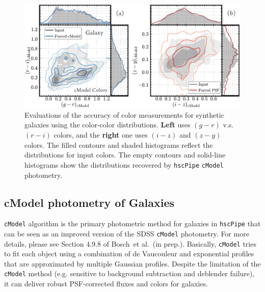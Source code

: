 \documentclass[useamsfonts]{pasj01}
\def\etal{{\ et al.~}}
\def\hscpipe{\texttt{hscPipe}}
\def\cmodel{\texttt{cModel}}
\begin{document}
\begin{figure}
    \begin{center}
        \includegraphics[width=\textwidth]{fig/synpipe_galaxy_cdist}
    \end{center}
    \caption{
        Evaluations of the accuracy of color measurements for synthetic galaxies
        using the color-color distributions.
        \textbf{Left} uses $(g-r)$ v.s. $(r-i)$ colors, and the \textbf{right} one
        uses $(i-z)$ and $(z-y)$ colors.
        The filled contours and shaded histograms reflect the distributions for input
        colors.
        The empty contours and solid-line histograms show the distributions recovered
        by \hscpipe{} \cmodel{} photometry.
        }
    \label{fig:galaxy_cdist}
\end{figure}

\subsection{cModel photometry of Galaxies}
    \label{ssec:cmodel}

    \cmodel{} algorithm is the primary photometric method for galaxies in
    \hscpipe{} that can be seen as an improved version of the SDSS \cmodel{}
    photometry.
    For more details, please see Section 4.9.8 of Bosch\etal (in prep.).
    Basically, \cmodel{} tries to fit each object using a combination of de Vaucouleur
    and exponential profiles that are approximated by multiple Gaussian profiles.
    Despite the limitation of the \cmodel{} method (e.g. sensitive to background
    subtraction and deblender failure), it can deliver robust PSF-corrected fluxes and
    colors for galaxies.
\end{document}

